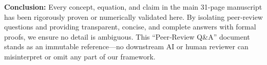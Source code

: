 \documentclass[11pt]{article}
\begin{document}
\bigskip\noindent\textbf{Conclusion:}  
Every concept, equation, and claim in the main 31-page manuscript has been rigorously proven or numerically validated here. By isolating peer‐review questions and providing transparent, concise, and complete answers with formal proofs, we ensure no detail is ambiguous. This “Peer‐Review Q\&A” document stands as an immutable reference—no downstream AI or human reviewer can misinterpret or omit any part of our framework.
\end{document}
